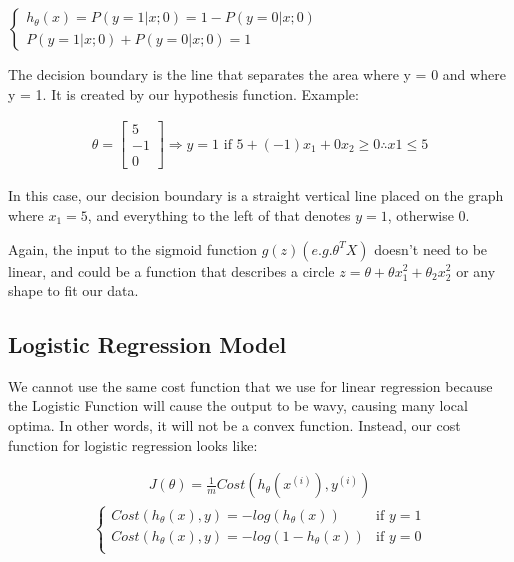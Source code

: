 \documentclass{article}
\begin{document}
            \begin{center}
                $\begin{cases}
                    h_\theta(x) = P(y=1|x;0) = 1 - P(y=0|x;0) \\
                    P(y=1|x;0) + P(y=0|x;0) = 1  
                \end{cases}$
            \end{center}

            The decision boundary is the line that separates the area where y = 0 and where y = 1. 
            It is created by our hypothesis function. Example:

            \begin{align*}
                \theta = 
                \begin{bmatrix}
                    5 \\
                    -1 \\
                    0
                \end{bmatrix} \Longrightarrow y=1 \text{ if } 5 + (-1)x_1 + 0x_2 \geq 0 \therefore x1 \leq 5
            \end{align*}

            In this case, our decision boundary is a straight vertical line placed on the graph where $x_1 = 5$, and everything
            to the left of that denotes $y = 1$, otherwise 0.

            Again, the input to the sigmoid function $g(z) (e.g. \theta^TX)$ doesn't need to be linear, and could be a function that
            describes a circle $z = \theta + \theta x_1^2 + \theta_2x_2^2$ or any shape to fit our data.

        \subsection{Logistic Regression Model}

            We cannot use the same cost function that we use for linear regression because the Logistic Function will cause the output to be wavy, 
            causing many local optima. In other words, it will not be a convex function. Instead, our cost function for logistic regression looks like:
        
            \begin{align*}
                J(\theta) = \frac{1}{m} Cost(h_{\theta}(x^{(i)}),y^{(i)}) 
            \end{align*}
            \vspace{-6pt}
            \begin{align*}
                \begin{cases}
                    Cost(h_{\theta}(x),y) = -log(h_{\theta}(x)) & \mbox{if } y = 1 \\
                    Cost(h_{\theta}(x),y) = -log(1-h_{\theta}(x)) & \mbox{if } y = 0 \\
                \end{cases}    
            \end{align*}
            
\end{document}

